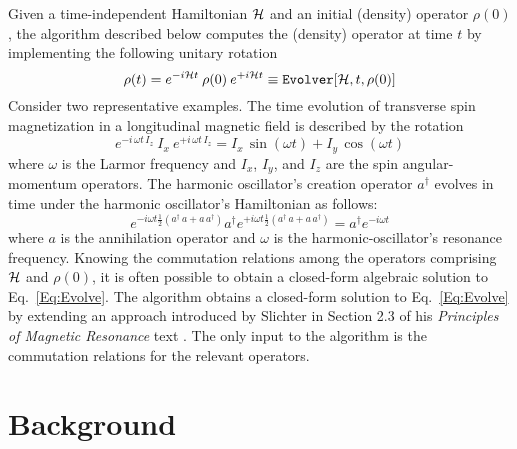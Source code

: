 
Given a time-independent Hamiltonian ${\cal H}$ and an initial (density) operator $\rho(0)$, the  algorithm described below computes the (density) operator at time $t$ by implementing the following unitary rotation
\begin{equation}
\rho(t) 
	= e^{-i {\cal H} t} \: \rho(0) \: e^{+i {\cal H} t}
	\equiv \text{{\texttt{Evolver}}}[{\cal H},t,\rho(0)]
	\label{Eq:Evolve}
\end{equation}
Consider two representative examples.  The time evolution of transverse spin magnetization in a longitudinal magnetic field is described by the rotation
\begin{equation}
e^{-i \, \omega t \, I_z} \: 
  I_x \: 
  e^{+i \, \omega t \, I_z} 
   = I_x \, \sin{(\omega t)} + I_y \, \cos{(\omega t)}
   \label{eq:example-spin}
\end{equation}
where $\omega$ is the Larmor frequency and $I_x$, $I_y$, and $I_z$ are the spin angular-momentum operators.  The harmonic oscillator's creation operator $a^{\dagger}$ evolves in time under the harmonic oscillator's Hamiltonian as follows:
 \begin{equation}
 e^{- i \omega t \frac{1}{2} (a^{\dagger} \, a + a \, a^{\dagger})} 
   a^{\dagger}
   e^{+ i \omega t \frac{1}{2} (a^{\dagger} \, a + a \, a^{\dagger})} 
   =  a^{\dagger} e^{-i \omega t}
   \label{eq:example-ho}
\end{equation}
where $a$ is the annihilation operator and $\omega$ is the harmonic-oscillator's resonance frequency.
Knowing the commutation relations among the operators comprising ${\cal H}$ and $\rho(0)$, it is often possible to obtain a closed-form algebraic solution to Eq.~\ref{Eq:Evolve}.  
The  algorithm obtains a closed-form solution to Eq.~\ref{Eq:Evolve} by extending an approach introduced by Slichter in Section 2.3 of his \emph{Principles of Magnetic Resonance} text \cite{Slichter1990}.
The only input to the algorithm is the commutation relations for the relevant operators.

\section{Background}

